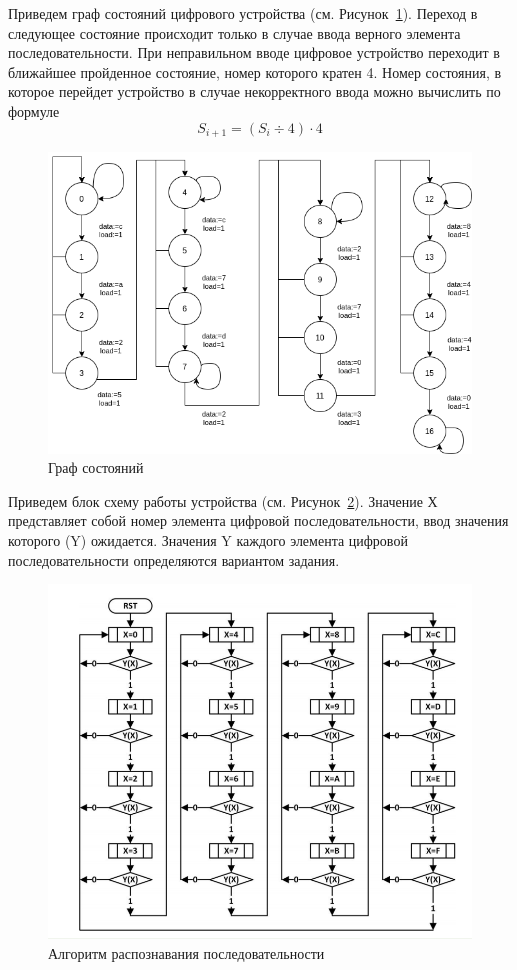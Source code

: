\documentclass[a4paper,14pt]{extarticle}
\begin{document}
Приведем граф состояний цифрового устройства (см. Рисунок~\ref{fig:state-graph-pract3}). Переход в следующее состояние происходит только в случае ввода верного элемента последовательности. При неправильном вводе цифровое устройство переходит в ближайшее пройденное состояние, номер которого кратен 4. Номер состояния, в которое перейдет устройство в случае некорректного ввода можно вычислить по формуле 
\[S_{i+1}=(S_i \div 4) \cdot 4\]

\begin{figure}[h!]
	\centering
	\includegraphics[width=0.7\linewidth]{images/state-graph-pract3}
	\caption{Граф состояний}
	\label{fig:state-graph-pract3}
\end{figure}

Приведем блок схему работы устройства (см. Рисунок~\ref{fig:algorithm-pract3}). Значение Х представляет
собой номер элемента цифровой последовательности, ввод значения которого (Y)
ожидается. Значения Y каждого элемента цифровой последовательности определяются
вариантом задания.

\begin{figure}[h!]
	\centering
	\includegraphics[width=0.68\linewidth]{images/algorithm-pract3}
	\caption{Алгоритм распознавания последовательности}
	\label{fig:algorithm-pract3}
\end{figure}
\end{document}
